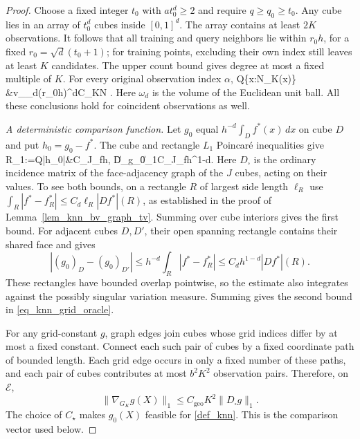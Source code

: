 \documentclass[twoside,11pt]{article}
\newenvironment{revision}{\color{revisionred}}{}
\begin{document}
\begin{revision}
\begin{proof}
Choose a fixed integer $t_0$ with $at_0^d\ge2$ and require
$q\ge q_0\ge t_0$. Any cube lies in an array of $t_0^d$ cubes
inside $[0,1]^d$. The array contains at least $2K$ observations.
It follows that all training and query neighbors lie within
$r_0h$, for a fixed $r_0=\sqrt d(t_0+1)$; for training points,
excluding their own index still leaves at least $K$ candidates.
The upper count bound gives degree at most a fixed multiple of $K$.
For every original observation index $\alpha$,
\beq
\label{eq_knn_query_load}
Q\{x:\alpha\in N_K(x)\}
&\le v_{\max}\omega_d(r_0h)^d\le C_{}\frac KN .
\beq
Here $\omega_d$ is the volume of the Euclidean unit ball.
All these conclusions hold for coincident observations as well.

\emph{A deterministic comparison function.}
Let $g_0$ equal $h^{-d}\int_D f^*(x)\,dx$ on cube $D$ and put
$h_0=g_0-f^*$. The cube and rectangle $L_1$ Poincar\'e inequalities
give
\beq
\label{eq_knn_grid_oracle}
R_1:=Q|h_0|&\le C_{}J_fh,\qquad
\|D_\square g_0\|_1\le C_{}J_fh^{1-d}.
\beq
Here $D_\square$ is the ordinary incidence matrix of the
face-adjacency graph of the $J$ cubes, acting on their values.
To see both bounds, on a rectangle $R$ of largest side length
$\ell_R$ use
$\int_R|f^*-f_R^*|\le C_d\ell_R|Df^*|(R)$, as established in the
proof of Lemma~\ref{lem_knn_bv_graph_tv}. Summing over cube interiors
gives the first bound. For adjacent cubes $D,D'$, their open
spanning rectangle contains their shared face and gives
\[
|(g_0)_D-(g_0)_{D'}|
\le h^{-d}\int_R|f^*-f_R^*|
\le C_dh^{1-d}|Df^*|(R).
\]
These rectangles have bounded overlap pointwise, so the estimate
also integrates against the possibly singular variation measure.
Summing gives the second bound in \eqref{eq_knn_grid_oracle}.

For any grid-constant $g$, graph edges join cubes whose grid
indices differ by at most a fixed constant. Connect each such
pair of cubes by a fixed coordinate path of bounded length.
Each grid edge occurs in only a fixed number of these paths,
and each pair of cubes contributes at most $b^2K^2$ observation
pairs. Therefore, on $\mathcal E$,
\[
\|\nabla_{G_K}g(X)\|_1\le C_{\mathrm{geo}}K^2\|D_\square g\|_1.
\]
The choice of $C_\star$ makes $g_0(X)$ feasible for \eqref{def_knn}.
This is the comparison vector used below.


\end{proof}
\end{revision}
\end{document}
